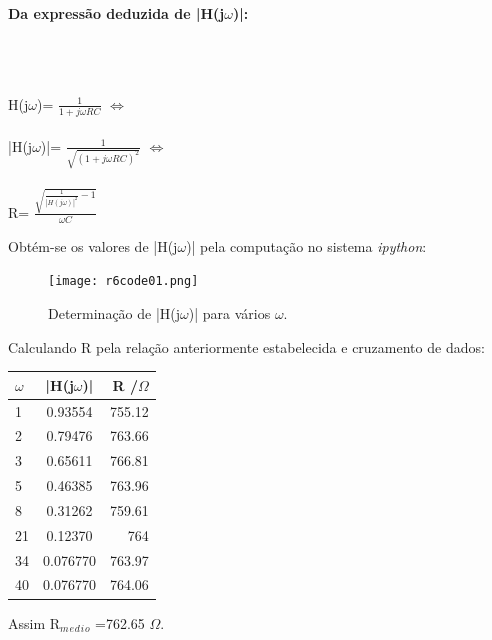 \documentclass[a4paper,12pt]{article}
\begin{document}
			\paragraph{Da expressão deduzida de |H(j$\omega$)|:} \mbox{}\\ \mbox{} \\
			\begin{center}
				H(j$\omega$)= $\frac{1}{1+j\omega RC}$ $\iff$ \\ \mbox{}\\
				|H(j$\omega$)|= $\frac{1}{\sqrt{(1+j\omega RC)^{2}}}$ $\iff$\\ \mbox{}\\
				R= $\frac{\sqrt{\frac{1}{|H(j\omega)|^{2}}-1}}{\omega C}$
			\end{center}
			Obtém-se os valores de |H(j$\omega$)| pela computação no sistema \textit{ipython}:
			\begin{figure}[H]
                        	\centering
                                \captionsetup{justification=centering}
                        	\texttt{[image: r6code01.png]}
				\caption{Determinação de |H(j$\omega$)| para vários $\omega$.}
          			\end{figure}
			  Calculando R pela relação anteriormente estabelecida e cruzamento de dados:\\
			\begin{center}
			  \begin{tabular}{||l|c|r||}
			    	\cline{1-3}
    					$\omega$ & |H(j$\omega$)| & R /$\Omega$  \\
    				\hline \hline
    					1 & 0.93554 &  755.12 \\
    				\hline
    					2 & 0.79476 & 763.66 \\
    				\hline
    					3 & 0.65611 & 766.81 \\
				\hline
                                	5 & 0.46385 &  763.96 \\
				\hline
                                	8 & 0.31262 & 759.61\\
				\hline
                                	21 & 0.12370 & 764 \\
				\hline
                                	34 & 0.076770 & 763.97  \\
				\hline
                                	40 & 0.076770 & 764.06 \\
				\cline{1-3}
			\end{tabular}
		       \end{center}
			Assim R$_m$$_e$$_d$$_i$$_o$ =762.65 $\Omega$.
\end{document}
